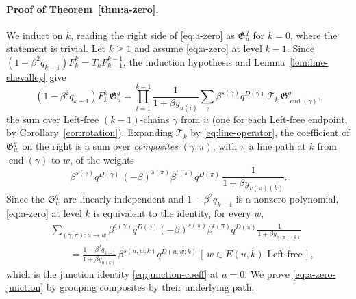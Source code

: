 \documentclass[11pt]{article}
\newcommand{\G}{\mathfrak{G}}
\begin{document}
\paragraph{Proof of Theorem~\ref{thm:a-zero}.}
We induct on $k$, reading the right side of \eqref{eq:a-zero} as
$\G^q_u$ for $k=0$, where the statement is trivial. Let $k\geq1$ and
assume \eqref{eq:a-zero} at level $k-1$. Since
$(1-\beta^2q_{k-1})F^k_k=T_kF^{k-1}_{k-1}$, the induction hypothesis
and Lemma~\ref{lem:line-chevalley} give
\[
 (1-\beta^2q_{k-1})F^k_k\,\G^q_u
 =\prod_{i=1}^{k-1}\frac1{1+\beta y_{u(i)}}
  \sum_{\gamma}\beta^{s(\gamma)}q^{D(\gamma)}\,
  \mathcal T_k\,\G^q_{\operatorname{end}(\gamma)},
\]
the sum over Left-free $(k-1)$-chains $\gamma$ from $u$ (one for each
Left-free endpoint, by Corollary~\ref{cor:rotation}). Expanding
$\mathcal T_k$ by \eqref{eq:line-operator}, the coefficient of
$\G^q_w$ on the right is a sum over \emph{composites} $(\gamma,\pi)$,
with $\pi$ a line path at $k$ from $\operatorname{end}(\gamma)$ to $w$,
of the weights
\[
 \beta^{s(\gamma)}q^{D(\gamma)}\,
 (-\beta)^{s(\pi)}\beta^{t(\pi)}q^{D(\pi)}\,
 \frac1{1+\beta y_{v(\pi)(k)}} .
\]
Since the $\G^q_w$ are linearly independent and $1-\beta^2q_{k-1}$ is
a nonzero polynomial, \eqref{eq:a-zero} at level $k$ is equivalent to
the identity, for every $w$,
\begin{equation}\label{eq:a-zero-junction}
\begin{split}
 &\sum_{(\gamma,\pi)\colon u\to w}
 \beta^{s(\gamma)}q^{D(\gamma)}
 (-\beta)^{s(\pi)}\beta^{t(\pi)}q^{D(\pi)}
 \frac1{1+\beta y_{v(\pi)(k)}}\\
 &\qquad=\frac{1-\beta^2q_{k-1}}{1+\beta y_{u(k)}}\,
  \beta^{s(u,w;k)}q^{D(u,w;k)}\,
  [\,w\in E(u,k)\text{ Left-free}\,],
\end{split}
\end{equation}
which is the junction identity \eqref{eq:junction-coeff} at $a=0$.
We prove \eqref{eq:a-zero-junction} by grouping composites by their
underlying path.
\end{document}

